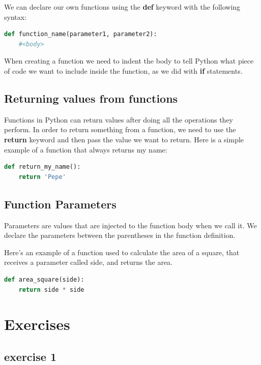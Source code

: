 \documentclass{tufte-handout}
\begin{document}
We can declare our own functions using the \textbf{def} keyword with the
following syntax:

\begin{lstlisting}[language=Python]
def function_name(parameter1, parameter2):
    #<body>
\end{lstlisting}

When creating a function we need to indent the body to tell Python
what piece of code we want to include inside the function, as we did
with \textbf{if} statements.

\subsection{Returning values from functions}\label{sec:returningvalues}

Functions in Python can return values after doing all the operations
they perform.  In order to return something from a function, we need
to use the \textbf{return} keyword and then pass the value we want to
return.  Here is a simple example of a function that always returns my
name:

\begin{lstlisting}[language=Python]
def return_my_name():
    return 'Pepe'
\end{lstlisting}

\subsection{Function Parameters}\label{sec:functionparameters}

Parameters are values that are injected to the function body when we
call it.  We declare the parameters between the parentheses in the
function definition.

Here's an example of a function used to calculate the area of a
square, that receives a parameter called side, and returns the area.

\begin{lstlisting}[language=Python]
def area_square(side):
    return side * side
\end{lstlisting}

\pagebreak

\section{Exercises}\label{sec:exercises}

\subsection{exercise 1}\label{sec:ex1}
\end{document}

